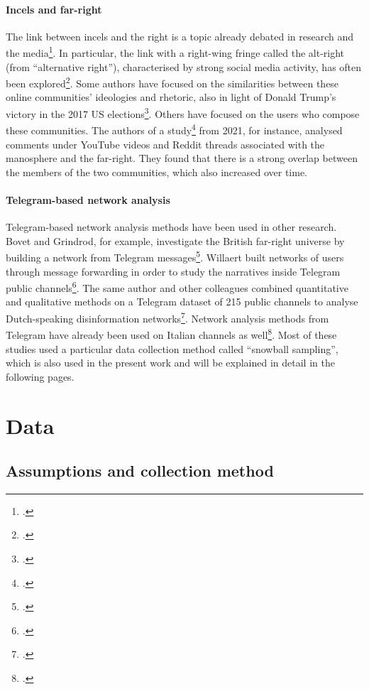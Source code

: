 \documentclass[a4paper,twoside,12pt, openany]{book}
\begin{document}
\subsubsection*{Incels and far-right}
The link between incels and the right is a topic already debated in research and the media\footcite{sugiura2021a}. In particular, the link with a right-wing fringe called the alt-right (from “alternative right”), characterised by strong social media activity, has often been explored\footcite{zotero-206}. Some authors have focused on the similarities between these online communities' ideologies and rhetoric, also in light of Donald Trump's victory in the 2017 US elections\footcite{nagle2017}. Others have focused on the users who compose these communities. The authors of a study\footcite{mamie2021} from 2021, for instance, analysed comments under YouTube videos and Reddit threads associated with the manosphere and the far-right. They found that there is a strong overlap between the members of the two communities, which also increased over time.

\subsubsection*{Telegram-based network analysis}
Telegram-based network analysis methods have been used in other research. Bovet and Grindrod, for example, investigate the British far-right universe by building a network from Telegram messages\footcite{bovet2022}. Willaert built networks of users through message forwarding in order to study the narratives inside Telegram public channels\footcite{willaert2023}. The same author and other colleagues combined quantitative and qualitative methods on a Telegram dataset of 215 public channels to analyse Dutch-speaking disinformation networks\footcite{willaert2022}. Network analysis methods from Telegram have already been used on Italian channels as well\footcite{alvisi2024}. Most of these studies used a particular data collection method called \enquote{snowball sampling}, which is also used in the present work and will be explained in detail in the following pages.

\clearpage

\chapter{Data}
\label{ch:data}

\section{Assumptions and collection method}
\end{document}
